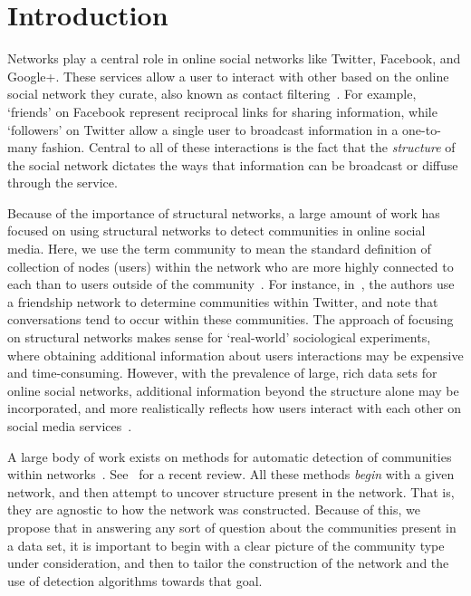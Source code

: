 \section{Introduction}

Networks play a central role in online social networks like Twitter, Facebook, and Google+. These services allow a user to interact with other based on the online social network they curate, also known as contact filtering~\cite{cazabet2012automated}. For example, `friends' on Facebook represent reciprocal links for sharing information, while `followers' on Twitter allow a single user to broadcast information in a one-to-many fashion. Central to all of these interactions is the fact that the \emph{structure} of the social network dictates the ways that information can be broadcast or diffuse through the service.

Because of the importance of structural networks, a large amount of work has focused on using structural networks to detect communities in online social media. Here, we use the term community to mean the standard definition of collection of nodes (users) within the network who are more highly connected to each than to users outside of the community~\cite{newman2004finding}. For instance, in~\cite{java2009we}, the authors use a friendship network to determine communities within Twitter, and note that conversations tend to occur within these communities. The approach of focusing on structural networks makes sense for `real-world' sociological experiments, where obtaining additional information about users interactions may be expensive and time-consuming. However, with the prevalence of large, rich data sets for online social networks, additional information beyond the structure alone may be incorporated, and more realistically reflects how users interact with each other on social media services~\cite{grabowicz2012social}.

A large body of work exists on methods for automatic detection of communities within networks~\cite{newman2004fast,newman2004finding,rosvall2008maps,blondel2008fast,LancichinettiPlos}. See~\cite{fortunato2010community} for a recent review. All these methods \emph{begin} with a given network, and then attempt to uncover structure present in the network. That is, they are agnostic to how the network was constructed. Because of this, we propose that in answering any sort of question about the communities present in a data set, it is important to begin with a clear picture of the community type under consideration, and then to tailor the construction of the network and the use of detection algorithms towards that goal.

